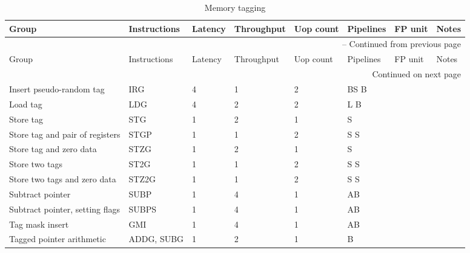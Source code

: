 \begin{longtable}{|p{1in}|p{1in}|l|l|l|p{1in}|l|p{1in}|}
\caption{Memory tagging} \\
\hline
Group & Instructions & Latency & Throughput & Uop count & Pipelines & FP unit & Notes\\
\hline
\endfirsthead
\hline
\multicolumn{8}{|r|}{{\tablename\ \thetable{} -- Continued from previous page}} \\
\hline
Group & Instructions & Latency & Throughput & Uop count & Pipelines & FP unit & Notes\\
\hline
\endhead
\hline
\multicolumn{8}{|r|}{{Continued on next page}} \\
\hline
\endfoot
\hline
\endlastfoot
Insert pseudo-random tag & IRG & 4 & 1 & 2 & BS B &  & \\
\hline
Load tag & LDG & 4 & 2 & 2 & L B &  & \\
\hline
Store tag & STG & 1 & 2 & 1 & S &  & \\
\hline
Store tag and pair of registers & STGP & 1 & 1 & 2 & S S &  & \\
\hline
Store tag and zero data & STZG & 1 & 2 & 1 & S &  & \\
\hline
Store two tags & ST2G & 1 & 1 & 2 & S S &  & \\
\hline
Store two tags and zero data & STZ2G & 1 & 1 & 2 & S S &  & \\
\hline
Subtract pointer & SUBP & 1 & 4 & 1 & AB &  & \\
\hline
Subtract pointer, setting flags & SUBPS & 1 & 4 & 1 & AB &  & \\
\hline
Tag mask insert & GMI & 1 & 4 & 1 & AB &  & \\
\hline
Tagged pointer arithmetic & ADDG, SUBG & 1 & 2 & 1 & B &  & \\
\hline
\end{longtable}
